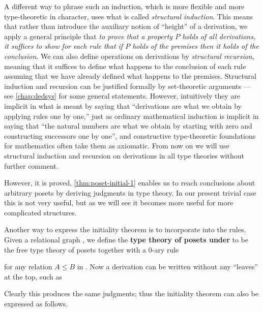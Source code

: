 A different way to phrase such an induction, which is more flexible and more type-theoretic in character, uses what is called \emph{structural induction}.
This means that rather than introduce the auxiliary notion of ``height'' of a derivation, we apply a general principle that \emph{to prove that a property $P$ holds of all derivations, it suffices to show for each rule that if $P$ holds of the premises then it holds of the conclusion}.
We can also define operations on derivations by \emph{structural recursion}, meaning that it suffices to define what happens to the conclusion of each rule assuming that we have already defined what happens to the premises.
Structural induction and recursion can be justified formally by set-theoretic arguments --- see \cref{chap:dedsys} for some general statements.
However, intuitively they are implicit in what is meant by saying that ``derivations are what we obtain by applying rules one by one,'' just as ordinary mathematical induction is implicit in saying that ``the natural numbers are what we obtain by starting with zero and constructing successors one by one'', and constructive type-theoretic foundations for mathematics often take them as axiomatic.
From now on we will use structural induction and recursion on derivations in all type theories without further comment.

However, it is proved, \cref{thm:poset-initial-1} enables us to reach conclusions about arbitrary posets by deriving judgments in type theory.
In our present trivial case this is not very useful, but as we will see it becomes more useful for more complicated structures.

Another way to express the initiality theorem is to incorporate \cG into the rules.
Given a relational graph \cG, we define the \textbf{type theory of posets under \cG} to be the free type theory of posets together with a 0-ary rule
\begin{mathpar}
\end{mathpar}
for any relation $A\le B$ in \cG.
Now a derivation can be written without any ``leaves'' at the top, such as
\begin{mathpar}
\end{mathpar}
Clearly this produces the same judgments; thus the initiality theorem can also be expressed as follows.

